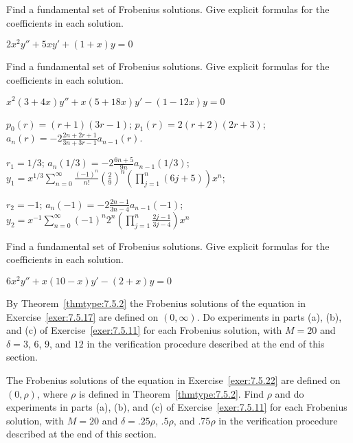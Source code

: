 \documentclass{ximera}
\begin{document}
\begin{problem}\label{exer:7.5.23} 
Find a
fundamental set of Frobenius solutions. Give explicit formulas for the
coefficients in each solution.

$2x^2y''+5xy'+(1+x)y=0$

\end{problem}

\begin{problem}\label{exer:7.5.24} 
Find a
fundamental set of Frobenius solutions. Give explicit formulas for the
coefficients in each solution.

$x^2(3+4x)y''+x(5+18x)y'-(1-12x)y=0$

\begin{solution}
    $p_0(r)=(r+1)(3r-1)$;
$p_1(r)=2(r+2)(2r+3)$;
$a_n(r)=-2\frac{2n+2r+1}{ 3n+3r-1}a_{n-1}(r)$.

$r_1=1/3$;
$a_n(1/3)=-2\frac{6n+5}{ 9n}a_{n-1}(1/3)$;
$y_1=x^{1/3}\sum_{n=0}^\infty\frac{(-1)^n}{
n!}\left(\frac{2}{9}\right)^n\left(\prod_{j=1}^n(6j+5)\right)
x^n$;

$r_2=-1$;
$a_n(-1)=-2\frac{2n-1}{ 3n-4}a_{n-1}(-1)$;
$y_2=x^{-1}\sum_{n=0}^\infty(-1)^n2^n\left(\prod_{j=1}^n
\frac{2j-1}{3j-4}\right) x^n$
\end{solution}

\end{problem}

\begin{problem}\label{exer:7.5.25} 
Find a
fundamental set of Frobenius solutions. Give explicit formulas for the
coefficients in each solution.

$6x^2y''+x(10-x)y'-(2+x)y=0$

\end{problem}

\begin{problem}\label{exer:7.5.26}
By Theorem~\ref{thmtype:7.5.2} the Frobenius solutions of the equation in
Exercise~\ref{exer:7.5.17} are defined on $(0,\infty)$. Do experiments
in parts (a), (b), and (c) of Exercise~\ref{exer:7.5.11} for each Frobenius
solution,
with $M=20$ and $\delta=3$, $6$, $9$, and $12$ in the verification
procedure described at the end of this section.
\end{problem}

\begin{problem}\label{exer:7.5.27}
The Frobenius solutions of the equation in Exercise~\ref{exer:7.5.22} are
defined on $(0,\rho)$, where $\rho$ is defined in
Theorem~\ref{thmtype:7.5.2}. Find $\rho$ and do experiments in parts (a), (b), and (c) of Exercise~\ref{exer:7.5.11} for each Frobenius solution, with
$M=20$ and
$\delta=.25\rho$, $.5\rho$, and $.75\rho$ in the verification
procedure described at the end of this section.
\end{problem}
\end{document}

